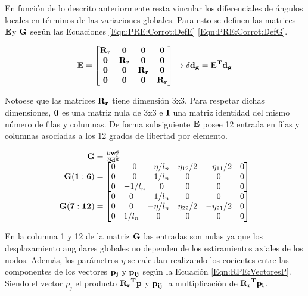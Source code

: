 En función de lo descrito anteriormente resta vincular los diferenciales de ángulos locales en términos de las variaciones globales. Para esto se definen las matrices $\bf{E} $y $\bf{G}$ según las Ecuaciones \eqref{Eqn:PRE:Corrot:DefE} \eqref{Eqn:PRE:Corrot:DefG}.

\begin{equation}\label{Eqn:PRE:Corrot:DefE}
	\bf{E}=\begin{bmatrix}
		\bf{R_r}& \bf{0}   & \bf{0}   & \bf{0} \\ 
		\bf{0}  & \bf{R_r} & \bf{0}   & \bf{0}\\ 
		\bf{0}  & \bf{0}   & \bf{R_r} & \bf{0} \\ 
		\bf{0}  & \bf{0}   & \bf{0}   & \bf{R_r}
	\end{bmatrix}\rightarrow \delta \bf{d_g}=E^T \bf{d_g}
\end{equation}

Notoese que las matrices $\bf{R}_r$ tiene dimensión 3x3. Para respetar dichas dimensiones, $\bf{0}$ es una matriz nula de 3x3 e $\bf{I}$ una matriz identidad del mismo número de filas y columnas. De forma subsiguiente $\bf{E}$ posee 12 entrada en filas y columnas asociadas a los 12 grados de libertad por elemento. 

\begin{equation}\label{Eqn:PRE:Corrot:DefG}
	\begin{array}{r@{}l}
		\bf{G}&{}=\frac{\partial \bf{w_r^g}}{\partial \bf{d}^g}\\
		\bf{G}(1:6)&{}=\begin{bmatrix}
			0 &  0      &  \eta/l_n &  \eta_{12}/2  &-\eta_{11}/2  &  0  \\ 
			0 &  0      &   1/l_n   &       0       &      0       &  0   \\ 
			0 & -1/l_n  &      0    &       0       &      0       &  0    
		\end{bmatrix}\\
		\bf{G}(7:12)&{}=\begin{bmatrix}
			0  &  0    &   -1/l_n   &      0      &     0        &    0 \\
			0  &  0     &-\eta/l_n  & \eta_{22}/2 &-\eta_{21}/2  &    0 \\
			0  &  1/l_n &       0   &      0      &     0        &    0 
		\end{bmatrix}
	\end{array}
\end{equation}


En la columna 1 y 12 de la matriz $\bf{G}$ las entradas son nulas ya que los desplazamiento angulares globales no dependen de los estiramientos axiales de los nodos. Además, los parámetros $\eta$ se calculan realizando 
los cocientes entre las componentes de los vectores $\bf{p}_j$ y $\bf{p_{ij}}$ según la Ecuación \eqref{Eqn:RPE:VectoresP}. Siendo el vector $p_j$ el producto $\bf{R_r}^T\bf{p}$ y $\bf{p_{ij}}$ la multiplicación de $\bf{R_r}^T\bf{p}_i$. 

